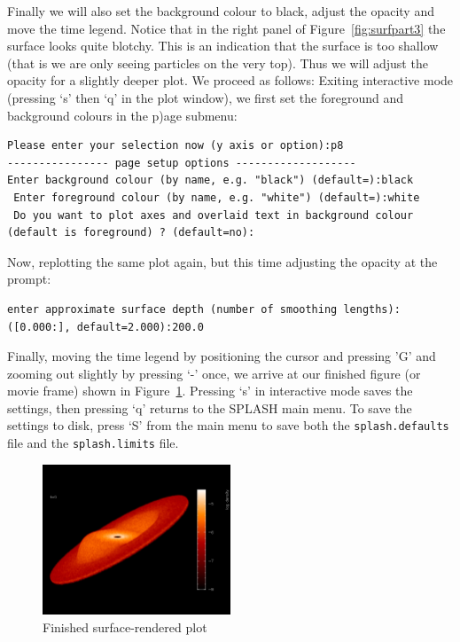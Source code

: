 \documentclass[a4paper,10pt]{article}
\newcommand{\splash}{\textsc{SPLASH }}
\begin{document}
Finally we will also set the background colour to black, adjust the opacity and move the time legend. 
Notice that in the right panel of Figure~\ref{fig:surfpart3} the surface looks quite blotchy. This is an indication that the surface is too shallow (that is we are only seeing particles on the very top). Thus we will adjust the opacity for a slightly deeper plot. We proceed as follows: Exiting interactive mode (pressing `s' then `q' in the plot window), we first set the foreground and background colours in the p)age submenu:
\begin{verbatim}
Please enter your selection now (y axis or option):p8
---------------- page setup options -------------------
Enter background colour (by name, e.g. "black") (default=):black
 Enter foreground colour (by name, e.g. "white") (default=):white
 Do you want to plot axes and overlaid text in background colour (default is foreground) ? (default=no):
\end{verbatim}
Now, replotting the same plot again, but this time adjusting the opacity at the prompt:
\begin{verbatim}
enter approximate surface depth (number of smoothing lengths): ([0.000:], default=2.000):200.0
\end{verbatim}
 Finally, moving the time legend by positioning the cursor and pressing 'G' and zooming out slightly by pressing `-' once, we arrive at our finished figure (or movie frame) shown in Figure~\ref{fig:surfpartfinal}. Pressing `s' in interactive mode saves the settings, then pressing `q' returns to the \splash main menu. To save the settings to disk, press `S' from the main menu to save both the \verb+splash.defaults+ file and the \verb+splash.limits+ file.
\begin{figure}[h!]
\begin{center}
\includegraphics[width=0.5\textwidth]{surfpartfinal.png}
\caption{Finished surface-rendered plot}
\label{fig:surfpartfinal}
\end{center}
\end{figure}
 
\end{document}

